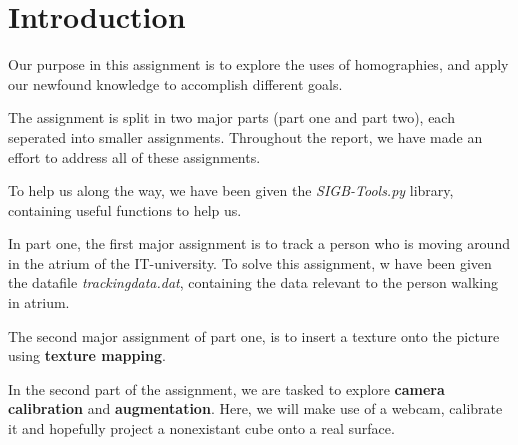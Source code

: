 \section{Introduction}
Our purpose in this assignment is to explore the uses of homographies, and apply our newfound knowledge to accomplish different goals.\newline

The assignment is split in two major parts (part one and part two), each seperated into smaller assignments. Throughout the report, we have made an effort to address all of these assignments.\newline

To help us along the way, we have been given the \textsl{SIGB-Tools.py} library, containing useful functions to help us.\newline

In part one, the first major assignment is to track a person who is moving around in the atrium of the IT-university. To solve this assignment, w have been given the datafile \textsl{trackingdata.dat}, containing the data relevant to the person walking in atrium.\newline

The second major assignment of part one, is to insert a texture onto the picture using \textbf{texture mapping}.

In the second part of the assignment, we are tasked to explore \textbf{camera calibration} and \textbf{augmentation}. Here, we will make use of a webcam, calibrate it and hopefully project a nonexistant cube onto a real surface.